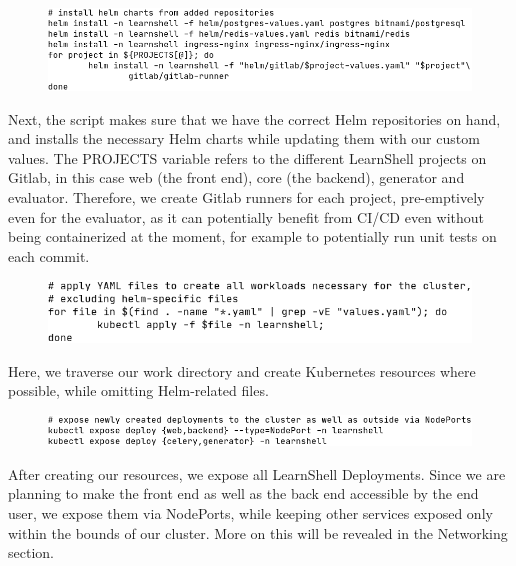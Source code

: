 \documentclass[thesis=B,english]{FITthesis}[2019/12/23]
\begin{document}
\begin{figure}[H]
\centering
\hspace*{-0.5cm}
\includegraphics[scale=0.5]{build-helm2}
\end{figure}

Next, the script makes sure that we have the correct Helm repositories on hand, and installs the necessary Helm charts while updating them with our custom values. The PROJECTS variable refers to the different LearnShell projects on Gitlab, in this case web (the front end), core (the backend), generator and evaluator. Therefore, we create Gitlab runners for each project, pre-emptively even for the evaluator, as it can potentially benefit from CI/CD even without being containerized at the moment, for example to potentially run unit tests on each commit.

\begin{figure}[H]
\centering
\hspace*{-1.5cm}
\includegraphics[scale=0.5]{build-kube1}
\end{figure}

Here, we traverse our work directory and create Kubernetes resources where possible, while omitting Helm-related files. 

\begin{figure}[H]
\centering
\hspace*{-0.5cm}
\includegraphics[scale=0.5]{build-kube2}
\end{figure}

After creating our resources, we expose all LearnShell Deployments. Since we are planning to make the front end as well as the back end accessible by the end user, we expose them via NodePorts, while keeping other services exposed only within the bounds of our cluster. More on this will be revealed in the Networking section.
\end{document}
